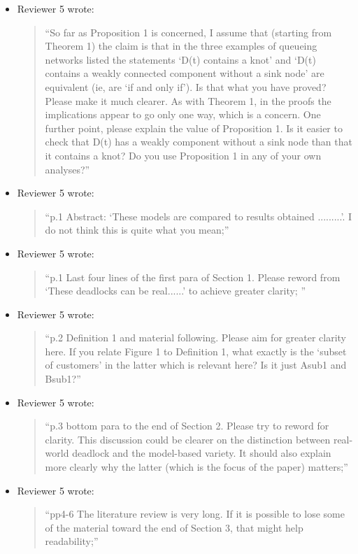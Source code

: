 \documentclass{article}
\begin{document}
\begin{itemize}
\item Reviewer 5 wrote:
\begin{quote}
``So far as Proposition 1 is concerned, I assume that (starting from Theorem 1) the claim is that in the three examples of queueing networks listed the statements ‘D(t) contains a knot’ and ‘D(t) contains a weakly connected component without a sink node’ are equivalent (ie, are ‘if and only if’). Is that what you have proved? Please make it much clearer. As with Theorem 1, in the proofs the implications appear to go only one way, which is a concern. One further point, please explain the value of Proposition 1. Is it easier to check that D(t) has a weakly component without a sink node than that it contains a knot? Do you use Proposition 1 in any of your own analyses?''
\end{quote}


\item Reviewer 5 wrote:
\begin{quote}
``p.1 Abstract: ‘These models are compared to results obtained .........’. I do not think this is quite what you mean;''
\end{quote}


\item Reviewer 5 wrote:
\begin{quote}
``p.1 Last four lines of the first para of Section 1. Please reword from ‘These deadlocks can be real......’ to achieve greater clarity;
''
\end{quote}


\item Reviewer 5 wrote:
\begin{quote}
``p.2 Definition 1 and material following. Please aim for greater clarity here. If you relate Figure 1 to Definition 1, what exactly is the ‘subset of customers’ in the latter which is relevant here? Is it just Asub1 and Bsub1?''
\end{quote}


\item Reviewer 5 wrote:
\begin{quote}
``p.3 bottom para to the end of Section 2. Please try to reword for clarity. This discussion could be clearer on the distinction between real-world deadlock and the model-based variety. It should also explain more clearly why the latter (which is the focus of the paper) matters;''
\end{quote}


\item Reviewer 5 wrote:
\begin{quote}
``pp4-6 The literature review is very long. If it is possible to lose some of the material toward the end of Section 3, that might help readability;''
\end{quote}



\end{itemize}
\end{document}

